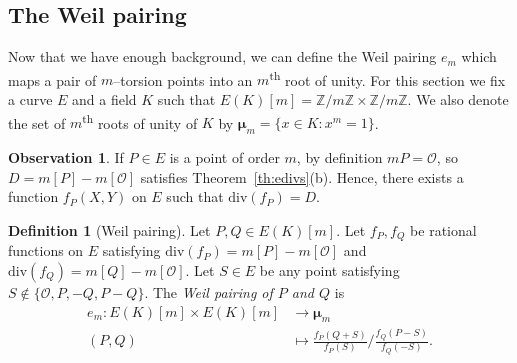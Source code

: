 \documentclass[9pt]{article}
\theoremstyle{definition}
\newtheorem{definition}{Definition}[section]
\newtheorem*{observation}{Observation}
\begin{document}
\subsection{The Weil pairing}
Now that we have enough background, we can define the Weil pairing $e_m$ which maps a pair of $m$--torsion points into an $m$\textsuperscript{th} root of unity. For this section we fix a curve $E$ and a field $K$ such that $E(K)[m] = \mathbb{Z}/m\mathbb{Z} \times \mathbb{Z}/m\mathbb{Z}$. We also denote the set of $m$\textsuperscript{th} roots of unity of $K$ by $\bm{\mu}_m = \{ x \in K : x^m = 1 \}$.
\begin{observation}
    If $P \in E$ is a point of order $m$, by definition $mP = \mathcal{O}$, so $D = m[P] - m[\mathcal{O}]$ satisfies Theorem~\ref{th:edivs}(b). Hence, there exists a function $f_P(X, Y)$ on $E$ such that $\text{div}(f_P) = D$.
\end{observation}
\begin{definition}[Weil pairing]
Let $P,Q \in E(K)[m]$. Let $f_P, f_Q$ be rational functions on $E$ satisfying $\text{div}(f_P) =  m[P] - m[\mathcal{O}]$ and $\text{div}(f_Q) =  m[Q] - m[\mathcal{O}]$. Let $S \in E$ be any point satisfying $S \not\in \{\mathcal{O}, P, -Q, P - Q \}$. The \textit{Weil pairing of $P$ and $Q$} is 
\begin{align*}
    e_m : E(K)[m] \times E(K)[m] &\longrightarrow \bm{\mu}_m \\
          (P, Q) &\longmapsto \frac{f_P(Q + S)}{f_P(S)} \bigg/ \frac{f_Q(P - S)}{f_Q(-S)}.
\end{align*}
\end{definition}
\end{document}
